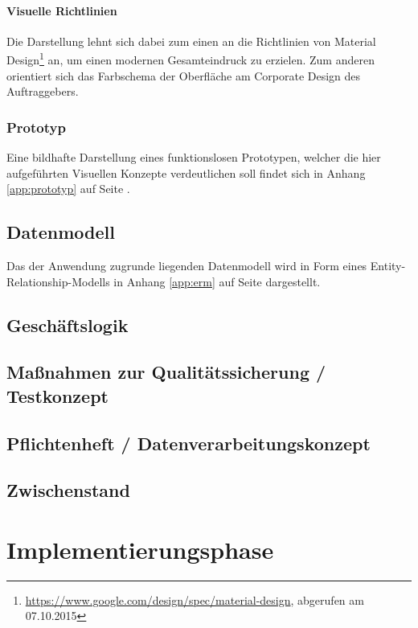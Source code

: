 \documentclass[12pt, xcolor=dvipsnames]{scrartcl}
\begin{document}
\paragraph{Visuelle Richtlinien}

Die Darstellung lehnt sich dabei zum einen an die Richtlinien von
Material Design\footnote{\url{https://www.google.com/design/spec/material-design}, abgerufen am 07.10.2015} an, um einen modernen Gesamteindruck zu erzielen.
Zum anderen orientiert sich das Farbschema der Oberfläche am Corporate Design des Auftraggebers.

\subsubsection{Prototyp}
Eine bildhafte Darstellung eines funktionslosen Prototypen, welcher die hier aufgeführten Visuellen Konzepte verdeutlichen soll findet sich in Anhang \ref{app:prototyp} auf Seite \pageref{app:prototyp}.

\subsection{Datenmodell}

Das der Anwendung zugrunde liegenden Datenmodell wird in Form eines Entity-Relationship-Modells in Anhang \ref{app:erm} auf Seite \pageref{app:erm} dargestellt.

\subsection{Geschäftslogik}

\subsection{Maßnahmen zur Qualitätssicherung / Testkonzept}

\subsection{Pflichtenheft / Datenverarbeitungskonzept}

\subsection{Zwischenstand}

\section{Implementierungsphase}
\end{document}
